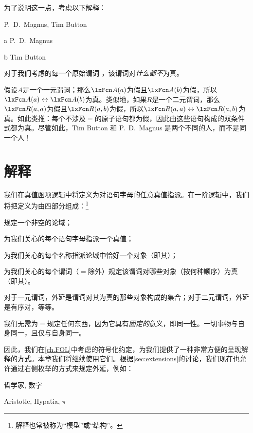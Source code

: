 为了说明这一点，考虑以下解释：

\begin{ekey}
		\item[\text{论域}] P.~D.\ Magnus, Tim Button
		\item[a] P.~D.\ Magnus
		\item[b] Tim Button
		\item[\atom{\metav{R}}{x_1,\dots, x_n}] 对于我们考虑的每一个原始谓词 ，该谓词对\emph{什么都不}为真。
	\end{ekey}

假设$A$是一个一元谓词；那么$\atom{A}{a}$为假且$\atom{A}{b}$为假，所以$\atom{A}{a} \eiff \atom{A}{b}$为真。类似地，如果$R$是一个二元谓词，那么$\atom{R}{a,a}$为假且$\atom{R}{a,b}$为假，所以$\atom{R}{a,a} \eiff \atom{R}{a,b}$为真。如此类推：每个不涉及$=$的原子语句都为假，因此由这些语句构成的双条件式都为真。尽管如此，Tim Button 和 P.~D.\ Magnus 是两个不同的人，而不是同一个人！

\section{解释}
我们在真值函项逻辑中将定义为对语句字母的任意真值指派。在一阶逻辑中，我们将把定义为由四部分组成：\footnote{解释也常被称为“模型”或“结构”。}


\begin{compactlist}
		\item 规定一个非空的论域；
		\item 为我们关心的每个语句字母指派一个真值；
		\item 为我们关心的每个名称指派论域中恰好一个对象（即其）；
		\item 为我们关心的每个谓词（$=$除外）规定该谓词对哪些对象（按何种顺序）为真（即其）。
	\end{compactlist}


对于一元谓词，外延是谓词对其为真的那些对象构成的集合；对于二元谓词，外延是有序对，等等。

我们无需为$=$规定任何东西，因为它具有\emph{固定的}意义，即同一性。一切事物与自身同一，且仅与自身同一。

因此，我们在\cref{ch.FOL}中考虑的符号化约定，为我们提供了一种非常方便的呈现解释的方式。本章我们将继续使用它们。根据\cref{sec:extensions}的讨论，我们现在也允许通过右侧枚举的方式来规定外延，例如：


\begin{ekey}
	\item[\text{论域}] 哲学家, 数字
	\item[\atom{H}{x}] Aristotle, Hypatia, $\pi$
\end{ekey}


